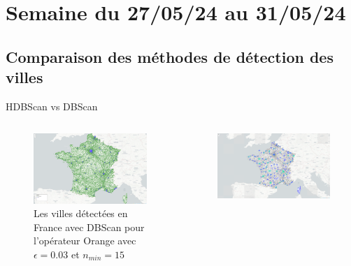 \smallframetitle

\section{Semaine du 27/05/24 au 31/05/24}
\insertsectionframe

\subsection{Comparaison des méthodes de détection des villes}
\insertsubsectionframe

\begin{frame}{HDBScan vs DBScan}
    \begin{columns}
        \begin{column}{0.5\textwidth}
            \begin{figure}
                \includegraphics[width=0.4\paperwidth]{images/France-Villes-Orange_0.03_15.png}
                \caption{\label{fig:fr-vi-or-0.03-15-bis}Les villes détectées en France avec DBScan pour l'opérateur Orange avec $\epsilon=0.03$ et $n_{min}=15$}
            \end{figure}
        \end{column}
        \begin{column}{0.5\textwidth}
            \begin{figure}
                \includegraphics[width=0.4\paperwidth]{images/villes_HDBSCAN.png}

\end{figure}
\end{column}
\end{columns}
\end{frame}
